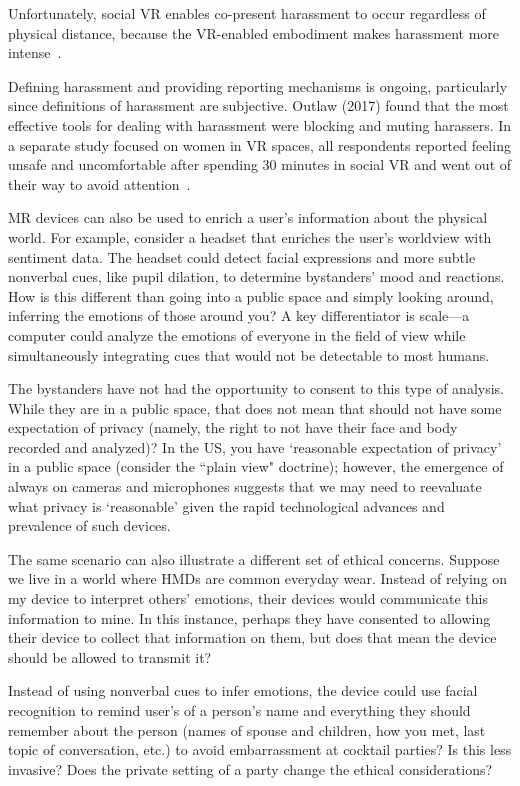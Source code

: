 Unfortunately, social VR enables co-present harassment to occur regardless of physical distance, because the VR-enabled embodiment  makes harassment more intense~\cite{blackwell}.

Defining harassment and providing reporting mechanisms is ongoing, particularly since definitions of harassment are subjective. Outlaw (2017) found that the most effective tools for dealing with harassment were blocking and muting harassers. In a separate study focused on women in VR spaces, all respondents reported feeling unsafe and uncomfortable after spending 30 minutes in social VR and went out of their way to avoid attention~\cite{outlaw2017}.

MR devices can also be used to enrich a user's information about the physical world. For example, consider a headset that enriches the user's worldview with sentiment data. The headset could detect facial expressions and more subtle nonverbal cues, like pupil dilation, to determine bystanders' mood and reactions. How is this different than going into a public space and simply looking around, inferring the emotions of those around you? A key differentiator is scale---a computer could analyze the emotions of everyone in the field of view while simultaneously integrating cues that would not be detectable to most humans.

The bystanders have not had the opportunity to consent to this type of analysis. While they are in a public space, that does not mean that should not have some expectation of privacy (namely, the right to not have their face and body recorded and analyzed)? In the US, you have `reasonable expectation of privacy' in a public space (consider the ``plain view" doctrine); however, the emergence of always on cameras and microphones suggests that we may need to reevaluate what privacy is `reasonable' given the rapid technological advances and prevalence of such devices.

The same scenario can also illustrate a different set of ethical concerns. Suppose we live in a world where HMDs are common everyday wear. Instead of relying on my device to interpret others' emotions, their devices would communicate this information to mine. In this instance, perhaps they have consented to allowing their device to collect that information on them, but does that mean the device should be allowed to transmit it?

Instead of using nonverbal cues to infer emotions, the device could use facial recognition to remind user's of a person's name and everything they should remember about the person (names of spouse and children, how you met, last topic of conversation, etc.) to avoid embarrassment at cocktail parties\cite{wassom2014augmented}? Is this less invasive? Does the private setting of a party change the ethical considerations?

